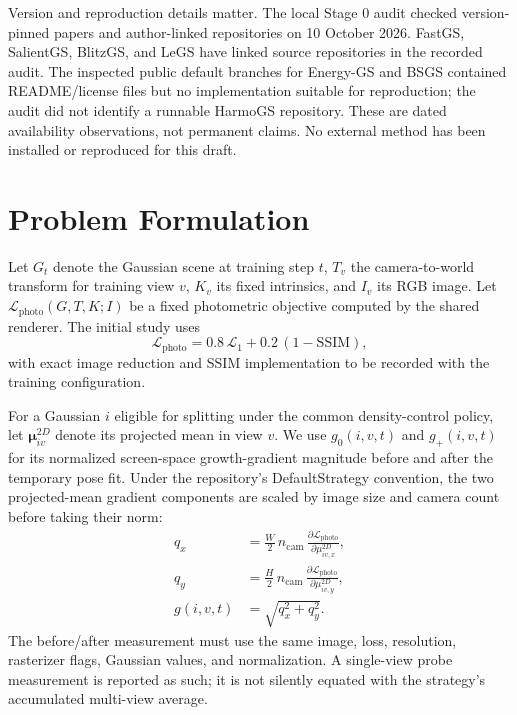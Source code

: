\documentclass[10pt]{article}
\begin{document}
Version and reproduction details matter. The local Stage 0 audit checked
version-pinned papers and author-linked repositories on 10 October 2026.
FastGS, SalientGS, BlitzGS, and LeGS have linked source repositories in the
recorded audit. The inspected public default branches for Energy-GS and BSGS
contained README/license files but no implementation suitable for reproduction;
the audit did not identify a runnable HarmoGS repository. These are dated
availability observations, not permanent claims. No external method has been
installed or reproduced for this draft.

\section{Problem Formulation}

Let \(G_t\) denote the Gaussian scene at training step \(t\), \(T_v\) the
camera-to-world transform for training view \(v\), \(K_v\) its fixed
intrinsics, and \(I_v\) its RGB image. Let
\(\mathcal{L}_{\mathrm{photo}}(G,T,K;I)\) be a fixed photometric objective
computed by the shared renderer. The initial study uses
\[
\mathcal{L}_{\mathrm{photo}}
 = 0.8\,\mathcal{L}_{1}
 + 0.2\,(1-\mathrm{SSIM}),
\]
with exact image reduction and SSIM implementation to be recorded with the
training configuration.

For a Gaussian \(i\) eligible for splitting under the common density-control
policy, let \(\boldsymbol{\mu}^{2D}_{iv}\) denote its projected mean in view
\(v\). We use \(g_0(i,v,t)\) and \(g_+(i,v,t)\) for its normalized screen-space
growth-gradient magnitude before and after the temporary pose fit. Under the
repository's DefaultStrategy convention, the two projected-mean gradient
components are scaled by image size and camera count before taking their
norm:
\[
\begin{aligned}
q_x &= \frac{W}{2}\,n_{\mathrm{cam}}\,
       \frac{\partial\mathcal{L}_{\mathrm{photo}}}
            {\partial \mu^{2D}_{iv,x}},\\
q_y &= \frac{H}{2}\,n_{\mathrm{cam}}\,
       \frac{\partial\mathcal{L}_{\mathrm{photo}}}
            {\partial \mu^{2D}_{iv,y}},\\
g(i,v,t) &= \sqrt{q_x^2+q_y^2}.
\end{aligned}
\]
The before/after measurement must use the same image, loss, resolution,
rasterizer flags, Gaussian values, and normalization. A single-view probe
measurement is reported as such; it is not silently equated with the
strategy's accumulated multi-view average.
\end{document}
